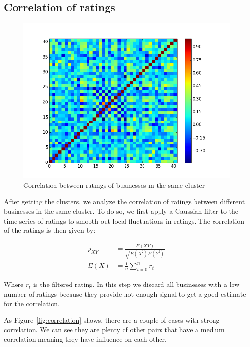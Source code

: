 \documentclass{vldb}
\begin{document}
\subsection{Correlation of ratings}
\label{sec:correlation_of_ratings}
\begin{figure}
\centering
\includegraphics[width=\columnwidth]{cov_cluster_28}
\caption{Correlation between ratings of businesses in the same cluster}
\label{fig:covmat}
\end{figure}
After getting the clusters, we analyze the correlation of ratings between different businesses in the same cluster.
To do so, we first apply a Gaussian filter to the time series of ratings to smooth out local fluctuations in ratings. The correlation of the ratings is then given by:

\begin{align*}
    \rho_{XY} &= \frac{E(XY)}{\sqrt{E(X^2) E(Y^2)}} \\
    E(X) &= \frac{1}{n} \sum_{t = 0}^{n} r_t
\end{align*}

Where $r_t$ is the filtered rating.
In this step we discard all businesses with a low number of ratings because they provide not enough signal to get a good estimate for the correlation.

As Figure~\ref{fig:correlation} shows, there are a couple of cases with strong correlation. We can see they are plenty of other pairs that have a medium correlation meaning they have influence on each other.
\end{document}
